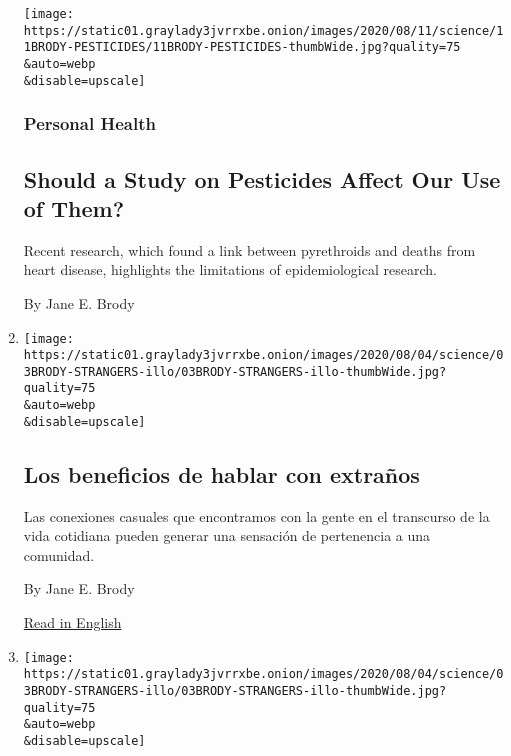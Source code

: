 \begin{enumerate}
  \texttt{[image: https://static01.graylady3jvrrxbe.onion/images/2020/08/11/science/11BRODY-PESTICIDES/11BRODY-PESTICIDES-thumbWide.jpg?quality=75\\\&auto=webp\\\&disable=upscale]}

  \hypertarget{personal-health-4}{%
  \subsubsection{Personal Health}\label{personal-health-4}}

  \hypertarget{should-a-study-on-pesticides-affect-our-use-of-them}{%
  \subsection{Should a Study on Pesticides Affect Our Use of
  Them?}\label{should-a-study-on-pesticides-affect-our-use-of-them}}

  Recent research, which found a link between pyrethroids and deaths
  from heart disease, highlights the limitations of epidemiological
  research.

  By Jane E. Brody
\item
  \href{/es/2020/08/07/espanol/hablar-con-desconocidos.html}{}

  \texttt{[image: https://static01.graylady3jvrrxbe.onion/images/2020/08/04/science/03BRODY-STRANGERS-illo/03BRODY-STRANGERS-illo-thumbWide.jpg?quality=75\\\&auto=webp\\\&disable=upscale]}

  \hypertarget{los-beneficios-de-hablar-con-extrauxf1os}{%
  \subsection{Los beneficios de hablar con
  extraños}\label{los-beneficios-de-hablar-con-extrauxf1os}}

  Las conexiones casuales que encontramos con la gente en el transcurso
  de la vida cotidiana pueden generar una sensación de pertenencia a una
  comunidad.

  By Jane E. Brody

  \href{https://www.nytimes3xbfgragh.onion/2020/08/03/well/family/the-benefits-of-talking-to-strangers.html}{Read
  in English}
\item
  \href{/2020/08/03/well/family/the-benefits-of-talking-to-strangers.html}{}

  \texttt{[image: https://static01.graylady3jvrrxbe.onion/images/2020/08/04/science/03BRODY-STRANGERS-illo/03BRODY-STRANGERS-illo-thumbWide.jpg?quality=75\\\&auto=webp\\\&disable=upscale]}


\end{enumerate}
